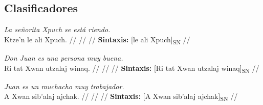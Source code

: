 \documentclass{article}%
\begin{document}
\subsection{Clasificadores}%
\label{subsec:Clasificadores}%

%
\par\medskip%
\ex
\textit{La señorita Xpuch se está riendo.} \\
\begingl
\gla Ktze'n le ali Xpuch. //
\glb  //
\glc  //
\glft \textbf{Sintaxis:} [le ali Xpuch]\textsubscript{SN} //
\endgl
\xe
%
\medskip%
\par\medskip%
\ex
\textit{Don Juan es una persona muy buena.} \\
\begingl
\gla Ri tat Xwan utzalaj winaq. //
\glb  //
\glc  //
\glft \textbf{Sintaxis:} [Ri tat Xwan utzalaj winaq]\textsubscript{SN} //
\endgl
\xe
%
\medskip%
\par\medskip%
\ex
\textit{Juan es un muchacho muy trabajador.} \\
\begingl
\gla A Xwan sib'alaj ajchak. //
\glb  //
\glc  //
\glft \textbf{Sintaxis:} [A Xwan sib'alaj ajchak]\textsubscript{SN} //
\endgl
\xe
%

%
\end{document}
